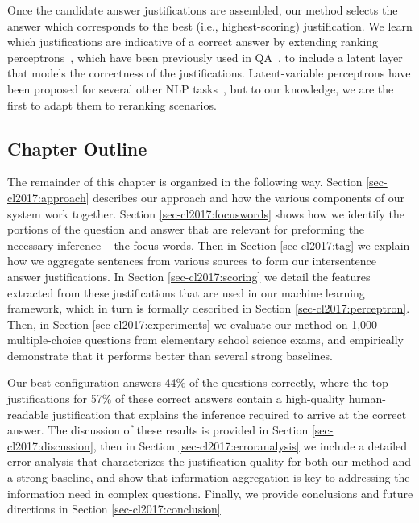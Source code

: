 Once the candidate answer justifications are assembled, our method selects the answer which corresponds to the best (i.e., highest-scoring) justification.  We learn which justifications are indicative of a correct answer by extending ranking perceptrons~\citep{Shen:Joshi:2005}, which have been previously used in QA~\citep{Surdeanu:11}, to include a latent layer that models the correctness of the justifications. Latent-variable perceptrons have been proposed for several other NLP tasks~\citep{liang2006end,zettlemoyer2007online,sun2009latent,hoffmann2011knowledge,fernandes2012latent,bjorkelund2014learning}, but to our knowledge, we are the first to adapt them to reranking scenarios. 

\subsection{Chapter Outline}

The remainder of this chapter is organized in the following way.  Section \ref{sec-cl2017:approach} describes our approach and how the various components of our system work together.  Section \ref{sec-cl2017:focuswords} shows how we identify the portions of the question and answer that are relevant for preforming the necessary inference -- the focus words.  Then in Section \ref{sec-cl2017:tag} we explain how we aggregate sentences from various sources to form our intersentence answer justifications.  In Section \ref{sec-cl2017:scoring} we detail the features extracted from these justifications that are used in our machine learning framework, which in turn is formally described in Section \ref{sec-cl2017:perceptron}.  
Then, in Section \ref{sec-cl2017:experiments} we evaluate our method on 1,000 multiple-choice questions from elementary school science exams, and empirically demonstrate that it performs better than several strong baselines.%

Our best configuration answers 44\% of the questions correctly, where the top justifications for 57\% of these correct answers contain a high-quality human-readable justification that explains the inference required to arrive at the correct answer.  
The discussion of these results is provided in Section \ref{sec-cl2017:discussion}, then in Section \ref{sec-cl2017:erroranalysis}
we include a detailed error analysis that characterizes the justification quality for both our method and a strong baseline, and show that information aggregation is key to addressing the information need in complex questions.  Finally, we provide conclusions and future directions in Section \ref{sec-cl2017:conclusion}


